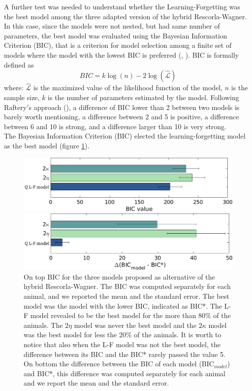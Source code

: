 A further test was needed to understand whether the Learning-Forgetting was the best model among the three adapted version of the hybrid Rescorla-Wagner. In this case, since the models were not nested, but had same number of parameters, the best model was evaluated using the Bayesian Information Criterion (BIC), that is a criterion for model selection among a finite set of models where the model with the lowest BIC is preferred (\cite{Schwarz}, \cite{NeathCavanaugh}). BIC is formally defined as 
\begin{equation*}
    BIC=k\log(n)-2\log(\hat{\mathcal{L}})
\end{equation*}
where: ${\hat{\mathcal{L}}}$ is the maximized value of the likelihood function of the model, $n$ is the sample size, $k$ is the number of parameters estimated by the model. Following Raftery$'$s approach (\cite{Raftery}), a difference of BIC lower than 2 between two models is barely worth mentioning, a difference between 2 and 5 is positive, a difference between 6 and 10 is strong, and a difference larger than 10 is very strong.\\The Bayesian Information Criterion (BIC) elected the learning-forgetting model as the best model (figure \ref{fig:BIC}).
\begin{figure}
    \centering
    \includegraphics[scale=0.45]{figures/BIC_Value.png}
    
    \vspace{1cm}
    
    \includegraphics[scale=0.45]{figures/DeltaBIC.png}
    \caption{On top BIC for the three models proposed as alternative of the hybrid Rescorla-Wagner. The BIC was computed separately for each animal, and we reported the mean and the standard error. The best model was the model with the lower BIC, indicated as BIC*. The L-F model revealed to be the best model for the more than 80$\%$ of the animals. The $2\eta$ model was never the best model and the $2\kappa$ model was the best model for less the 20$\%$ of the animals. It is worth to notice that also when the L-F model was not the best model, the difference between its BIC and the BIC* rarely passed the value 5. On bottom the difference between the BIC of each model (BIC$_{model}$) and BIC*, this difference was computed separately for each animal and we report the mean and the standard error.}
    \label{fig:BIC}
\end{figure}
